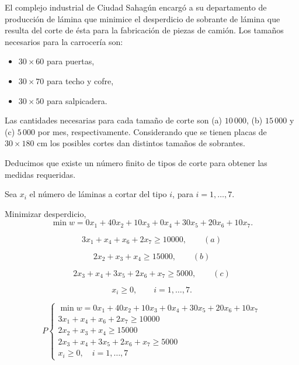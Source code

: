 \begin{Ejem} El complejo industrial de Ciudad Sahag\'un encarg\'o a su departamento de producci\'on de l\'amina que minimice el desperdicio de sobrante de l\'amina que resulta del corte de \'esta para la fabricaci\'on de piezas de cami\'on. Los tama\~nos necesarios para la carrocer\'ia son:

\begin{itemize}
\item $30 \times 60$ para puertas,
\item $30 \times 70$ para techo y cofre,
\item $30 \times 50$ para salpicadera.
\end{itemize}

Las cantidades necesarias para cada tama\~no de corte son (a) $10\,000$, (b) $15\,000$ y (c) $5\,000$ por mes, respectivamente. Considerando que se tienen placas de $30\times180$ cm los posibles cortes dan distintos tama\~nos de sobrantes.

Deducimos que existe un n\'umero finito de tipos de corte para obtener las medidas requeridas.

\begin{tcolorbox}[title=Variables de decisi\'on.] Sea $x_i$ el n\'umero de l\'aminas a cortar del tipo $i$, para $i=1,\dots,7$.
\end{tcolorbox}

\begin{tcolorbox}[title=Funci\'on objetivo.] Minimizar desperdicio,
\[
\min w = 0x_1 + 40x_2 + 10x_3 + 0x_4 + 30x_5 + 20x_6 + 10x_7.
\]
\end{tcolorbox}

\begin{tcolorbox}[title=Restricciones]
\[
3x_1 + x_4 + x_6 + 2x_7 \ge 10000, \qquad (a)
\]

\[
2x_2 + x_3 + x_4 \ge 15000, \qquad (b)
\]

\[
2x_3 + x_4 + 3x_5 + 2x_6 + x_7 \ge 5000, \qquad (c)
\]

\[
x_i \ge 0, \qquad i=1,\dots,7.
\]
\end{tcolorbox}

\begin{tcolorbox}[title=El problema queda planteado como:]
\[
P
\begin{cases}
\min w = 0x_1 + 40x_2 + 10x_3 + 0x_4 + 30x_5 + 20x_6 + 10x_7 \\
3x_1 + x_4 + x_6 + 2x_7 \ge 10000 \\
2x_2 + x_3 + x_4 \ge 15000 \\
2x_3 + x_4 + 3x_5 + 2x_6 + x_7 \ge 5000 \\
x_i \ge 0, \quad i=1,\dots,7
\end{cases}
\]
\end{tcolorbox}

\end{Ejem}

